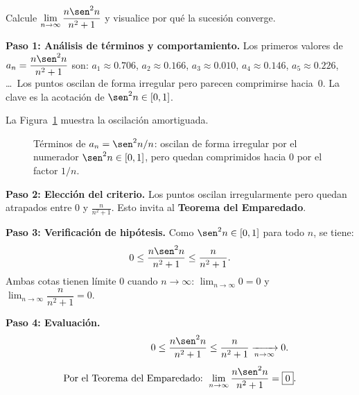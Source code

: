 \begin{example}
Calcule $\displaystyle\lim_{n \to \infty} \frac{n\sen^2 n}{n^2+1}$ y
visualice por qué la sucesión converge.
\begin{myproof}
\textbf{Paso 1: Análisis de términos y comportamiento.}
Los primeros valores de $a_n = \dfrac{n\sen^2 n}{n^2+1}$ son:
$a_1 \approx 0.706$, $a_2 \approx 0.166$, $a_3 \approx 0.010$,
$a_4 \approx 0.146$, $a_5 \approx 0.226$, \ldots\ Los puntos oscilan
de forma irregular pero parecen comprimirse hacia~$0$. La clave es la
acotación de $\sen^2 n \in [0,1]$.

La Figura~\ref{fig:sucesion_sen2_sobre_n} muestra la oscilación amortiguada.

\begin{figure}[H]
\centering
{}
\caption{Términos de $a_n=\sen^2 n/n$: oscilan de forma irregular por el numerador $\sen^2 n\in[0,1]$, pero quedan comprimidos hacia $0$ por el factor $1/n$.}
\label{fig:sucesion_sen2_sobre_n}
\end{figure}

\textbf{Paso 2: Elección del criterio.}
Los puntos oscilan irregularmente pero quedan atrapados entre $0$ y
$\frac{n}{n^2+1}$. Esto invita al \textbf{Teorema del Emparedado}.

\textbf{Paso 3: Verificación de hipótesis.}
Como $\sen^2 n \in [0,1]$ para todo $n$, se tiene:
\[
  0 \leq \frac{n\sen^2 n}{n^2+1} \leq \frac{n}{n^2+1}.
\]
Ambas cotas tienen límite $0$ cuando $n \to \infty$:
$\lim_{n\to\infty} 0 = 0$ y $\lim_{n\to\infty} \dfrac{n}{n^2+1} = 0$.

\textbf{Paso 4: Evaluación.}
\begin{align*}
  0 \leq \frac{n\sen^2 n}{n^2+1} &\leq \frac{n}{n^2+1} \xrightarrow[n\to\infty]{} 0. \\[4pt]
  \text{Por el Teorema del Emparedado: } &\lim_{n \to \infty}
  \frac{n\sen^2 n}{n^2+1} = \boxed{0}.
\end{align*}
\end{myproof}
\end{example}




